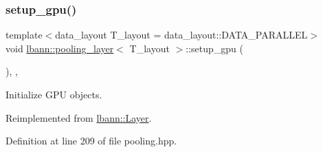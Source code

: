\mbox{\label{classlbann_1_1pooling__layer_a603adc8abc7527f2fd12eb4264b0f3cc}} 
\subsubsection{\texorpdfstring{setup\+\_\+gpu()}{setup\_gpu()}}
{\footnotesize\ttfamily template$<$data\+\_\+layout T\+\_\+layout = data\+\_\+layout\+::\+D\+A\+T\+A\+\_\+\+P\+A\+R\+A\+L\+L\+EL$>$ \\
void \hyperlink{classlbann_1_1pooling__layer}{lbann\+::pooling\+\_\+layer}$<$ T\+\_\+layout $>$\+::setup\+\_\+gpu (\begin{DoxyParamCaption}{ }\end{DoxyParamCaption})\hspace{0.3cm}{\ttfamily [inline]}, {\ttfamily [override]}, {\ttfamily [virtual]}}



Initialize G\+PU objects. 



Reimplemented from \hyperlink{classlbann_1_1Layer_a36aa22ef90ce4de65abe729d38490863}{lbann\+::\+Layer}.



Definition at line 209 of file pooling.\+hpp.



